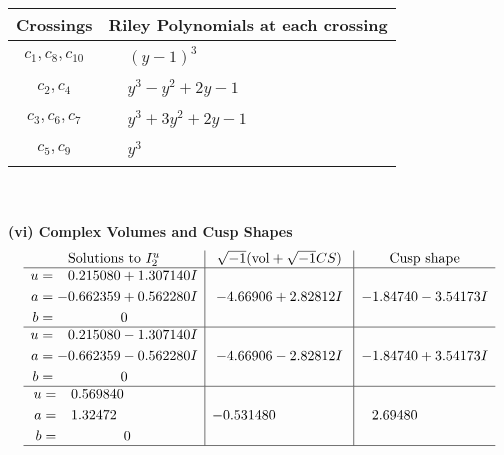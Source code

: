 \documentclass[1p]{elsarticle_modified}
\theoremstyle{definition}
\newcommand{\I}{\sqrt{-1}}
\begin{document}
\begin{tabular}{m{50pt}|m{274pt}}
Crossings & \hspace{64pt}Riley Polynomials at each crossing \\
\hline $$\begin{aligned}c_{1},c_{8},c_{10}\end{aligned}$$&$\begin{aligned}
&(y-1)^3
\end{aligned}$\\
\hline $$\begin{aligned}c_{2},c_{4}\end{aligned}$$&$\begin{aligned}
&y^3- y^2+2 y-1
\end{aligned}$\\
\hline $$\begin{aligned}c_{3},c_{6},c_{7}\end{aligned}$$&$\begin{aligned}
&y^3+3 y^2+2 y-1
\end{aligned}$\\
\hline $$\begin{aligned}c_{5},c_{9}\end{aligned}$$&$\begin{aligned}
&y^3
\end{aligned}$\\
\hline
\end{tabular}\\~\\
\newpage\flushleft \textbf{(vi) Complex Volumes and Cusp Shapes}
$$\begin{array}{c|c|c}  
\text{Solutions to }I^u_{2}& \I (\text{vol} + \sqrt{-1}CS) & \text{Cusp shape}\\
 \hline 
\begin{aligned}
u &= \phantom{-}0.215080 + 1.307140 I \\
a &= -0.662359 + 0.562280 I \\
b &= \phantom{-0.000000 } 0\end{aligned}
 & -4.66906 + 2.82812 I & -1.84740 - 3.54173 I \\ \hline\begin{aligned}
u &= \phantom{-}0.215080 - 1.307140 I \\
a &= -0.662359 - 0.562280 I \\
b &= \phantom{-0.000000 } 0\end{aligned}
 & -4.66906 - 2.82812 I & -1.84740 + 3.54173 I \\ \hline\begin{aligned}
u &= \phantom{-}0.569840\phantom{ +0.000000I} \\
a &= \phantom{-}1.32472\phantom{ +0.000000I} \\
b &= \phantom{-0.000000 } 0\end{aligned}
 & -0.531480\phantom{ +0.000000I} & \phantom{-}2.69480\phantom{ +0.000000I}\\
 \hline 
 \end{array}$$\newpage
\end{document}
